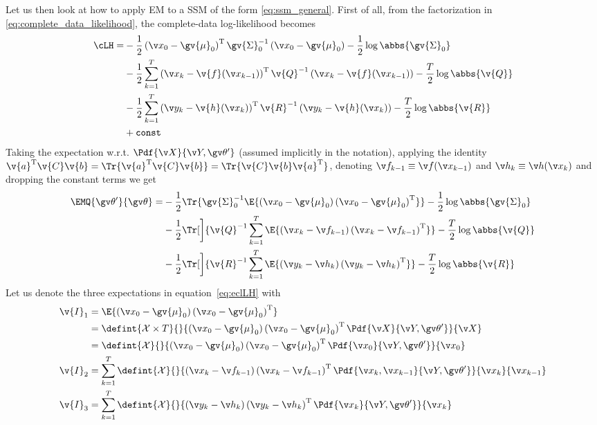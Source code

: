 Let us then look at how to apply EM to a SSM of the form \eqref{eq:ssm_general}. First of
all, from the factorization in \eqref{eq:complete_data_likelihood}, the complete-data log-likelihood becomes
\begin{align*}
\begin{split}
	\cLH =&-\frac{1}{2}\left(\x_0-\gv{\mu}_0\right)^\tr\gv{\Sigma}_0^{-1}\left(\x_0-\gv{\mu}_0\right)-\frac{1}{2}\log\abbs{\gv{\Sigma}_0}\\
	&-\frac{1}{2}\sum_{k=1}^T\left(\x_k-\v{f}(\x_{k-1})\right)^\tr\v{Q}^{-1}\left(\x_k-\v{f}(\x_{k-1})\right)-\frac{T}{2}\log\abbs{\v{Q}}\\
	&-\frac{1}{2}\sum_{k=1}^T\left(\y_k-\v{h}(\x_{k})\right)^\tr\v{R}^{-1}\left(\y_k-\v{h}(\x_{k})\right)-\frac{T}{2}\log\abbs{\v{R}}\\
	&+\mathtt{const}
\end{split}
\end{align*}
Taking the expectation w.r.t. $\Pdf{\X}{\Y,\Th'}$ (assumed implicitly in the notation), applying the identity $\v{a}^\tr\v{C}\v{b}=\Tr{\v{a}^\tr\v{C}\v{b}}=\Tr{\v{C}\v{b}\v{a}^\tr}$, 
denoting $\f_{k-1}\equiv \f(\x_{k-1})$ and $\h_k\equiv \h(\x_k)$ and dropping the constant terms we get
\begin{align}
\begin{split}
	\EMQ{\Th'}{\Th} =&-\frac{1}{2}\Tr{\gv{\Sigma}_0^{-1}\E{\left(\x_0-\gv{\mu}_0\right)\left(\x_0-\gv{\mu}_0\right)^\tr}}-\frac{1}{2}\log\abbs{\gv{\Sigma}_0}\\
	&-\frac{1}{2}\Tr[\bigg]{\v{Q}^{-1}\sum_{k=1}^T\E{\left(\x_k-\f_{k-1}\right)\left(\x_k-\f_{k-1}\right)^\tr}}-\frac{T}{2}\log\abbs{\v{Q}}\\
	&-\frac{1}{2}\Tr[\bigg]{\v{R}^{-1}\sum_{k=1}^T\E{\left(\y_k-\h_{k}\right)\left(\y_k-\h_{k}\right)^\tr}}-\frac{T}{2}\log\abbs{\v{R}}
\end{split}
\label{eq:eclLH}
\end{align} 
Let us denote the three expectations in equation~\eqref{eq:eclLH} with
\begin{align}
	\v{I}_1 &= \E{\left(\x_0-\gv{\mu}_0\right)\left(\x_0-\gv{\mu}_0\right)^\tr}\\ 
	&=\defint{\mathcal{X}\times T}{}{\left(\x_0-\gv{\mu}_0\right)\left(\x_0-\gv{\mu}_0\right)^\tr\Pdf{\X}{\Y,\Th'}}{\X}\nonumber\\
	&= 	\defint{\mathcal{X}}{}{\left(\x_0-\gv{\mu}_0\right)\left(\x_0-\gv{\mu}_0\right)^\tr\Pdf{\x_0}{\Y,\Th'}}{\x_0} \label{eq:I1_general}\\
	\v{I}_2 &= \sum_{k=1}^T\defint{\mathcal{X}}{}{\left(\x_k-\f_{k-1}\right)\left(\x_k-\f_{k-1}\right)^\tr\Pdf{\xk,\xkk}{\Y,\Th'}}{\xk}{\xkk} \label{eq:I2_general}\\
	\v{I}_3 &= \sum_{k=1}^T\defint{\mathcal{X}}{}{\left(\y_k-\h_{k}\right)\left(\y_k-\h_{k}\right)^\tr\Pdf{\xk}{\Y,\Th'}}{\xk} \label{eq:I3_general}
\end{align}

